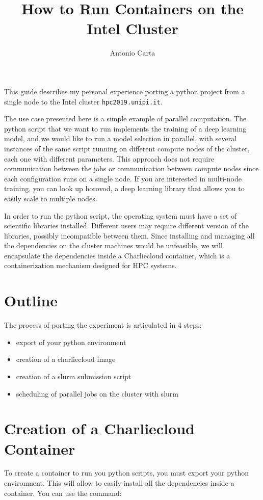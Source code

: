\documentclass{article}
\title{How to Run Containers on the Intel Cluster}
\author{Antonio Carta}
\begin{document}
    \maketitle

    This guide describes my personal experience porting a python project from a single node to the Intel cluster \verb!hpc2019.unipi.it!.
    
    The use case presented here is a simple example of parallel computation. The python script that we want to run implements the training of a deep learning model, and we would like to run a model selection in parallel, with several instances of the same script running on different compute nodes of the cluster, each one with different parameters. This approach does not require communication between the jobs or communication between compute nodes since each configuration runs on a single node. If you are interested in multi-node training, you can look up horovod, a deep learning library that allows you to easily scale to multiple nodes.

    In order to run the python script, the operating system must have a set of scientific libraries installed. Different users may require different version of the libraries, possibly incompatible between them. Since installing and managing all the dependencies on the cluster machines would be unfeasible, we will encapsulate the dependencies inside a Charliecloud container, which is a containerization mechanism designed for HPC systems.
    
    \section{Outline}
    The process of porting the experiment is articulated in 4 steps:
    \begin{itemize}
        \item export of your python environment
        \item creation of a charliecloud image
        \item creation of a slurm submission script
        \item scheduling of parallel jobs on the cluster with slurm
    \end{itemize}

    \section{Creation of a Charliecloud Container}
    To create a container to run you python scripts, you must export your python environment. This will allow to easily install all the dependencies inside a container. You can use the command:
\end{document}
